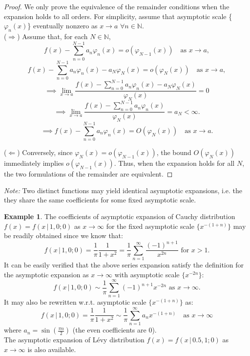 \documentclass{article}
\theoremstyle{definition}
\newtheorem{appendixexample}[appendixdefinition]{Example}
\begin{document}
\begin{appendices}
\begin{proof}We only prove the equivalence of the remainder conditions when the expansion holds to all orders. For simplicity, assume that asymptotic scale \{\(\varphi_n(x)\)\} eventually nonzero as \(x\to a\) \(\forall n\in\mathbb{N}\).\\
(\(\Rightarrow\)) Assume that, for each \(N \in \mathbb{N}\),
\[
f(x)-\sum_{n=0}^{N-1} a_n\varphi_n(x) = o( \varphi_{N-1}(x)) \quad \text{as } x \to a,
\]
\[
f(x)-\sum_{n=0}^{N-1} a_n\varphi_n(x)-a_{N}\varphi_{N}(x)= o( \varphi_{N}(x)) \quad \text{as } x \to a,
\]
\[
\implies\lim_{x\to a}{\frac{f(x)-\sum_{n=0}^{N-1} a_n\varphi_n(x)-a_{N}\varphi_{N}(x)}{\varphi_{N}(x)}}=0
\]
\[
\implies \lim_{x\to a}\frac{f(x)-\sum_{n=0}^{N-1} a_n\varphi_n(x)}{\varphi_{N}(x)}=a_{N}<\infty.
\]
\[
\implies f(x)-\sum_{n=0}^{N-1}a_n\varphi_n(x)= O(\varphi_{N}(x)) \quad\text{as }x\to a.
\]

(\(\Leftarrow\)) Conversely, since \(\varphi_N(x)=o(\varphi_{N-1}(x))\), the bound
\(O(\varphi_N(x))\) immediately implies \(o(\varphi_{N-1}(x))\).
Thus, when the expansion holds for all $N$, the two formulations of the
remainder are equivalent.%
\end{proof}
\textit{Note:} Two distinct functions may yield identical asymptotic expansions, i.e. the they share the same coefficients for some fixed asymptotic scale.
\begin{appendixexample}\label{ex:Cauchy-asymp-exp}
    The coefficients of  asymptotic expansion of Cauchy distribution \(f(x)=f(x\,|\,1,0;0)\) as \(x\to\infty\) for the fixed asymptotic scale \(\{x^{-(1+n)}\}\) may be readily obtained since we know that:
\begin{equation*}
f(x\,|\,1,0;0)=\frac{1}{\pi}\frac{1}{1+x^2}=\frac{1}{\pi}\sum_{n=1}^\infty\frac{(-1)^{n+1}}{x^{2n}} \text{ for }x>1.
\end{equation*}
It can be easily verified that the above series expansion satisfy the definition for the asymptotic expansion as \(x\to\infty\) with asymptotic scale \(\{x^{-2n}\}\):
\begin{equation}
   f(x\,|\,1,0;0)\sim\frac{1}{\pi}\sum_{n=1}^\infty(-1)^{n+1}x^{-2n} \text{ as }x\to\infty. 
\end{equation}
It may also be rewritten w.r.t. asymptotic scale \(\{x^{-(1+n)}\}\) as:
\begin{equation*}
    f(x\,|\,1,0;0)=\frac{1}{\pi}\frac{1}{1+x^2}\sim\frac{1}{\pi}\sum_{n=1}^\infty{a_n}x^{-(1+n)} \quad \text{as }x\to\infty
\end{equation*}
where \(a_n=\sin{\!\left(\!\frac{\pi n}{2}\!\right)}\) (the even coefficients are 0).\\
The asymptotic expansion of L\'evy distribution \(f(x)=f(x\,|\,0.5,1;0)\) as \(x\to\infty\) is also available.\
\end{appendixexample}


\end{appendices}
\end{document}
